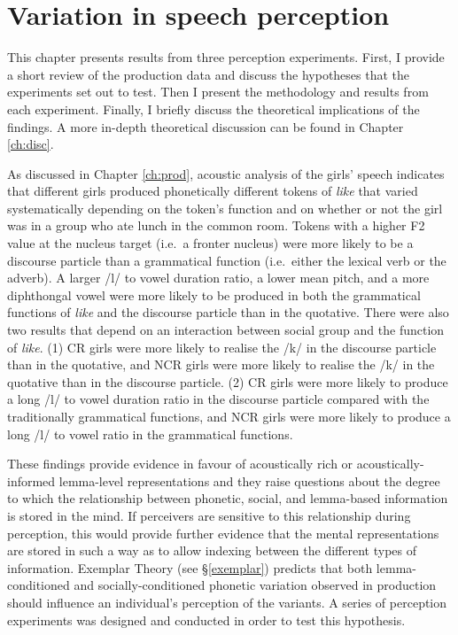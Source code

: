 \date{}
\chapter{Variation in speech perception}
\label{ch:perc}

\noindent This chapter presents results from three perception experiments. First, I provide a short review of the production data and discuss the hypotheses that the experiments set out to test. Then I present the methodology and results from each experiment. Finally, I briefly discuss the theoretical implications of the findings. A more in-depth theoretical discussion can be found in Chapter \ref{ch:disc}.

As discussed in Chapter \ref{ch:prod}, acoustic analysis of the girls' speech indicates that different girls produced phonetically different tokens of \textit{like} that varied systematically depending on the token's function and on whether or not the girl was in a group who ate lunch in the common room. Tokens with a higher F2 value at the nucleus target (i.e.~a fronter nucleus) were more likely to be a discourse particle than a grammatical function (i.e.~either the lexical verb or the adverb). A larger /l/ to vowel duration ratio, a lower mean pitch, and a more diphthongal vowel were more likely to be produced in both the grammatical functions of \textit{like} and the discourse particle than in the quotative. There were also two results that depend on an interaction between social group and the function of \textit{like}. (1) CR girls were more likely to realise the /k/ in the discourse particle than in the quotative, and NCR girls were more likely to realise the /k/ in the quotative than in the discourse particle. (2) CR girls were more likely to produce a long /l/ to vowel duration ratio in the discourse particle compared with the traditionally grammatical functions, and NCR girls were more likely to produce a long /l/ to vowel ratio in the grammatical functions. 

These findings provide evidence in fa\-vour of acous\-tically rich or acous\-ti\-cally-informed lemma-level representations and they raise questions about the degree to which the relationship between phonetic, social, and lemma-based information is stored in the mind. If perceivers are sensitive to this relationship during perception, this would provide further evidence that the mental representations are stored in such a way as to allow indexing between the different types of information. Exemplar Theory (see \S \ref{exemplar}) predicts that both lemma-conditioned and socially-conditioned phonetic variation observed in production should influence an individual's perception of the variants. A series of perception experiments was designed and conducted in order to test this hypothesis.

